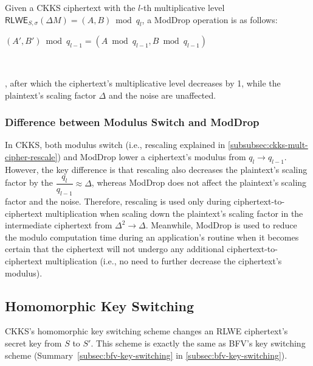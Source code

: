 \begin{tcolorbox}[title={\textbf{\tboxlabel{\ref*{subsec:ckks-mult-plain}} CKKS's \textsf{ModDrop}}}]

Given a CKKS ciphertext with the $l$-th multiplicative level $\textsf{RLWE}_{S, \sigma}(\Delta M) = (A, B) \bmod q_l$, a \textsf{ModDrop} operation is as follows: 

$(A', B') \bmod q_{l-1} = (A \bmod q_{l-1}, B \bmod q_{l-1})$

$ $

, after which the ciphertext's multiplicative level decreases by 1, while the plaintext's scaling factor $\Delta$ and the noise are unaffected. 

\end{tcolorbox}

\subsubsection{Difference between Modulus Switch and \textsf{ModDrop}}
\label{subsubsec:ckks-moddrop-vs-modswitch}

In CKKS, both modulus switch (i.e., rescaling explained in \autoref{subsubsec:ckks-mult-cipher-rescale}) and \textsf{ModDrop} lower a ciphertext's modulus from $q_l \rightarrow q_{l-1}$. However, the key difference is that rescaling also decreases the plaintext's scaling factor by the $\dfrac{q_l}{q_{l-1}} \approx \Delta$, whereas \textsf{ModDrop} does not affect the plaintext's scaling factor and the noise. Therefore, rescaling is used only during ciphertext-to-ciphertext multiplication when scaling down the plaintext's scaling factor in the intermediate ciphertext from $\Delta^2 \rightarrow \Delta$. Meanwhile, \textsf{ModDrop} is used to reduce the modulo computation time during an application's routine when it becomes certain that the ciphertext will not undergo any additional ciphertext-to-ciphertext multiplication (i.e., no need to further decrease the ciphertext's modulus). 



\subsection{Homomorphic Key Switching}
\label{subsec:ckks-key-switching}

CKKS's homomorphic key switching scheme changes an RLWE ciphertext's secret key from $S$ to $S'$. This scheme is exactly the same as BFV's key switching scheme (Summary~\ref*{subsec:bfv-key-switching} in \autoref{subsec:bfv-key-switching}).



